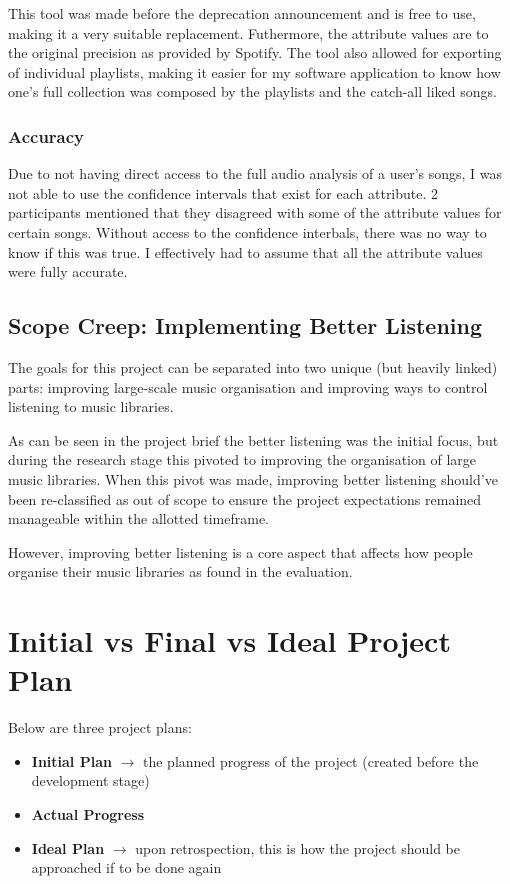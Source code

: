 This tool was made before the deprecation announcement and is free to use, making it a very suitable replacement. Futhermore, the attribute values are to the original precision as provided by Spotify. The tool also allowed for exporting of individual playlists, making it easier for my software application to know how one's full collection was composed by the playlists and the catch-all liked songs.

\subsubsection{Accuracy}%
Due to not having direct access to the full audio analysis of a user's songs, I was not able to use the confidence intervals that exist for each attribute. 2 participants mentioned that they disagreed with some of the attribute values for certain songs. Without access to the confidence interbals, there was no way to know if this was true. I effectively had to assume that all the attribute values were fully accurate.

\subsection{Scope Creep: Implementing Better Listening}
The goals for this project can be separated into two unique (but heavily linked) parts: improving large-scale music organisation and improving ways to control listening to music libraries.

As can be seen in the project brief the better listening was the initial focus, but during the research stage this pivoted to improving the organisation of large music libraries. When this pivot was made, improving better listening should've been re-classified as out of scope to ensure the project expectations remained manageable within the allotted timeframe.

However, improving better listening is a core aspect that affects how people organise their music libraries as found in the evaluation.

\section{Initial vs Final vs Ideal Project Plan}
Below are three project plans:\begin{itemize}
    \item \textbf{Initial Plan} \(\to\) the planned progress of the project (created before the development stage)
    \item \textbf{Actual Progress}
    \item \textbf{Ideal Plan} \(\to\) upon retrospection, this is how the project should be approached if to be done again
\end{itemize}

